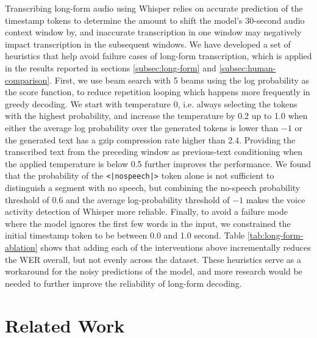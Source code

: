 \documentclass[nohyperref]{article}
\theoremstyle{plain}
\theoremstyle{definition}
\theoremstyle{remark}
\begin{document}
Transcribing long-form audio using Whisper relies on accurate prediction of the timestamp tokens to determine the amount to shift the model's 30-second audio context window by, and inaccurate transcription in one window may negatively impact transcription in the subsequent windows.
We have developed a set of heuristics that help avoid failure cases of long-form transcription, which is applied in the results reported in sections \ref{subsec:long-form} and \ref{subsec:human-comparison}.
First, we use beam search with 5 beams using the log probability as the score function, to reduce repetition looping which happens more frequently in greedy decoding. We start with temperature 0, i.e. always selecting the tokens with the highest probability, and increase the temperature by 0.2 up to 1.0 when either the average log probability over the generated tokens is lower than $-1$ or the generated text has a gzip compression rate higher than 2.4. Providing the transcribed text from the preceding window as previous-text conditioning when the applied temperature is below 0.5 further improves the performance.
We found that the probability of the \texttt{<|nospeech|>} token alone is not sufficient to distinguish a segment with no speech, but combining the no-speech probability threshold of 0.6 and the average log-probability threshold of $-1$ makes the voice activity detection of Whisper more reliable.
Finally, to avoid a failure mode where the model ignores the first few words in the input, we constrained the initial timestamp token to be between 0.0 and 1.0 second.
Table \ref{tab:long-form-ablation} shows that adding each of the interventions above incrementally reduces the WER overall, but not evenly across the dataset.
These heuristics serve as a workaround for the noisy predictions of the model, and more research would be needed to further improve the reliability of long-form decoding.




\section{Related Work}\label{sec:related}
\end{document}
